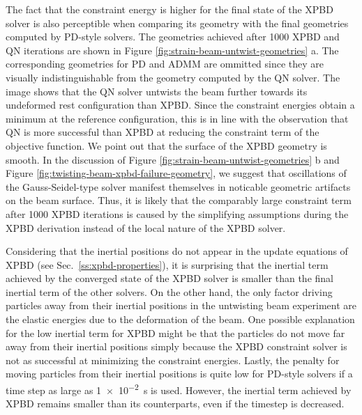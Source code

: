 The fact that the constraint energy is higher for the final state of the XPBD solver is also perceptible when comparing its geometry with the final geometries computed 
by PD-style solvers. The geometries achieved after 1000 XPBD and QN iterations are shown in Figure \ref{fig:strain-beam-untwist-geometries} a. 
The corresponding geometries for PD and ADMM are ommitted since they are visually indistinguishable from the geometry computed by the QN solver. The image shows 
that the QN solver untwists the beam further towards its undeformed rest configuration than XPBD. Since the constraint energies obtain a minimum at the reference 
configuration, this is in line with the observation that QN is more successful than XPBD at reducing the constraint term of the objective function. We point out that 
the surface of the XPBD geometry is smooth. In the discussion of Figure \ref{fig:strain-beam-untwist-geometries} b and Figure \ref{fig:twisting-beam-xpbd-failure-geometry},
we suggest that oscillations of the Gauss-Seidel-type solver manifest themselves in noticable geometric artifacts on the beam surface. Thus, it is likely that 
the comparably large constraint term after 1000 XPBD iterations is caused by the simplifying assumptions during the XPBD derivation instead of the local nature of 
the XPBD solver.

Considering that the inertial positions do not appear in the update equations of XPBD (see Sec.\ \ref{ss:xpbd-properties}), it is surprising that the inertial term achieved 
by the converged state of the XPBD solver is smaller than the final inertial term of the other solvers. On the other hand, the only factor driving particles away from 
their inertial positions in the untwisting beam experiment are the elastic energies due to the deformation of the beam. One possible explanation for the low inertial 
term for XPBD might be that the particles do not move far away from their inertial positions simply because the XPBD constraint solver is not as successful at 
minimizing the constraint energies. Lastly, the penalty for moving particles from their inertial positions is quite low for PD-style solvers if a time step as large 
as \SI{1e-2}{\second} is used. However, the inertial term achieved by XPBD remains smaller than its counterparts, even if the timestep is decreased.

